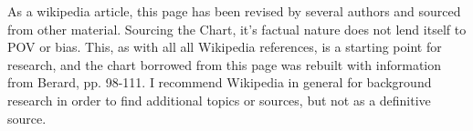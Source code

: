 As a wikipedia article, this page has been revised by several authors and
sourced from other material. Sourcing the Chart, it's factual nature does not
lend itself to POV or bias. This, as with all all Wikipedia references, is a
starting point for research, and the chart borrowed from this page was rebuilt
with information from Berard, pp. 98-111. I recommend Wikipedia in
general for background research in order to find additional topics or sources,
but not as a definitive source.
